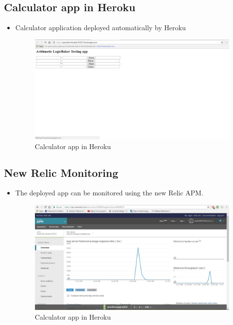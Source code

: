 \documentclass[12pt,a4paper,oneside]{report}
\begin{document}
{\subsection{Calculator app in Heroku}
\begin{itemize}
\item \par Calculator application deployed automatically by Heroku
\begin{figure}[h]
\begin{center}
\includegraphics[scale=.47]{app1.png}
\caption{Calculator app in Heroku}
\label{Calculator app in Heroku}
\end{center}
\end{figure}
\end{itemize}
\newpage
\subsection{New Relic Monitoring}
\begin{itemize}
\item \par The deployed app can be monitored using the new Relic APM.
\begin{figure}[h]
\begin{center}
\includegraphics[scale=.47]{newrelic.png}
\caption{Calculator app in Heroku}
\label{Calculator app in Heroku}
\end{center}
\end{figure}
\end{itemize}
\newpage
}
\end{document}
